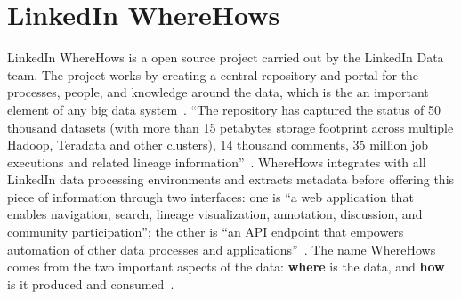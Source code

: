 \section{LinkedIn WhereHows}

LinkedIn WhereHows is a open source project carried out by the LinkedIn Data team. The project works 
by creating a central repository and portal for the processes, people, and knowledge around the data, 
which is the an important element of any big data system~\cite{hid-sp18-405-www-wherehows}. ``The 
repository has captured the status of 50 thousand datasets (with more than 15 petabytes storage 
footprint across multiple Hadoop, Teradata and other clusters), 14 thousand comments, 35 million job 
executions and related lineage information''~\cite{hid-sp18-405-www-wherehows}. WhereHows 
integrates with all LinkedIn data processing environments and extracts metadata before offering this 
piece of information through two interfaces: one is ``a web application that enables navigation, 
search, lineage visualization, annotation, discussion, and community participation''; the other is 
``an API endpoint that empowers automation of other data processes and 
applications''~\cite{hid-sp18-405-www-wherehows}. The name WhereHows comes from the  two 
important aspects of the data: \textbf{where} is the data, and \textbf{how} is it produced and 
consumed~\cite{hid-sp18-405-githubwiki-wherehows}.